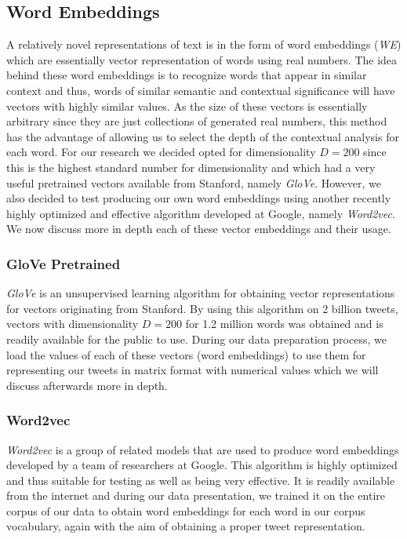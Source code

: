\documentclass[10pt,conference]{IEEEtran}
\begin{document}
\subsection{Word Embeddings}
A relatively novel representations of text is in the form of word embeddings (\textit{WE}) which are essentially vector representation of words using real numbers. The idea behind these word embeddings is to recognize words that appear in similar context and thus, words of similar semantic and contextual significance will have vectors with highly similar values. As the size of these vectors is essentially arbitrary since they are just collections of generated real numbers, this method has the advantage of allowing us to select the depth of the contextual analysis for each word. For our research we decided opted for dimensionality $D=200$ since this is the highest standard number for dimensionality and which had a very useful pretrained vectors available from Stanford, namely \textit{GloVe}. However, we also decided to test producing our own word embeddings using another recently highly optimized and effective algorithm developed at Google, namely \textit{Word2vec}. We now discuss more in depth each of these vector embeddings and their usage.

\subsubsection{GloVe Pretrained}
\textit{GloVe} is an unsupervised learning algorithm for obtaining vector representations for vectors originating from Stanford. By using this algorithm on 2 billion tweets, vectors with dimensionality $D=200$ for 1.2 million words was obtained and is readily available for the public to use. During our data preparation process, we load the values of each of these vectors (word embeddings) to use them for representing our tweets in matrix format with numerical values which we will discuss afterwards more in depth.

\subsubsection{Word2vec}
\textit{Word2vec} is a group of related models that are used to produce word embeddings developed by a team of researchers at Google. This algorithm is highly optimized and thus suitable for testing as well as being very effective. It is readily available from the internet and during our data presentation, we trained it on the entire corpus of our data to obtain word embeddings for each word in our corpus vocabulary, again with the aim of obtaining a proper tweet representation.
\end{document}
